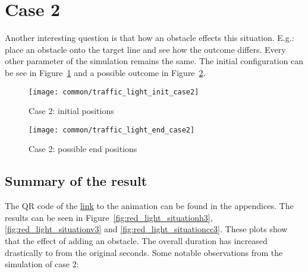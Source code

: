 		\section{Case 2}
			Another interesting question is that how an obstacle effects this situation. E.g.: place an obstacle onto the target line and see how the outcome differs. Every other parameter of the simulation remains the same. The initial configuration can be see in Figure~\ref{fig:traffic_light_init2} and a possible outcome in Figure~\ref{fig:traffic_light_end2}.
			\begin{figure}
				\centering
				\texttt{[image: common/traffic\_light\_init\_case2]}
				\caption{Case 2: initial positions}
				\label{fig:traffic_light_init2}
			\end{figure}
			\begin{figure}
				\centering
				\texttt{[image: common/traffic\_light\_end\_case2]}
				\caption{Case 2: possible end positions}
				\label{fig:traffic_light_end2}
			\end{figure}
			\subsection*{Summary of the result}
			The QR code of the \href{https://youtu.be/hluDHotqKyE}{\underline{link}} to the animation can be found in the appendices. The results can be seen in Figure~\ref{fig:red_light_situationh3}, \ref{fig:red_light_situationv3} and \ref{fig:red_light_situationcc3}. These plots show that the effect of adding an obstacle. The overall duration has increased drastically to from the original seconds.
			Some notable observations from the simulation of case 2:
			
